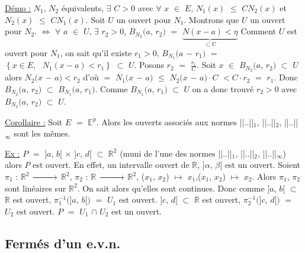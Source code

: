 \documentclass{article}
\begin{document}
\parindent=0cm
\smallbreak
\underline{Démo :} \parindent=1cm \smallbreak
$N_1$, $N_2$ équivalents, $\exists$ $C>0$ avec $\forall$ $x$ $\in$ $E$, $N_1(x)$ $\leqslant$ $CN_2(x)$ et $N_2(x)$ $\leqslant$ $CN_1(x)$.
\smallbreak
Soit $U$ un ouvert pour $N_1$. \smallbreak
Montrons que $U$ un ouvert pour $N_2$. $\Longleftrightarrow$ $\forall$ $a$ $\in$ $U$, $\exists$ $r_2>0$, $B_{N_{2}}(a$, $r_2)$ $=$ $\underset{\subset U}{\underbrace{N(x - a)< \eta}}$
\smallbreak
Comment $U$ est ouvert pour $N_1$, on sait qu'il existe $r_1>0$, $B_{N_{1}}(a$ $-$
$r_1)$ $=$ $\left\{ x \in E,\text{ } N_1(x-a)<r_1 \right\}$ $\subset$ $U$. 
\smallbreak
Posons $r_2$ $=$ $\frac{r_1}{C}$. Soit $x$ $\in$ $B_{N_{2}}(a$, $r_2)$ $\subset$ $U$ alors $N_2(x$ $-$ $a)<r_2$ d'où $=$ $N_1(x$ $-$ $a)$ $\leqslant$ $N_2(x$ $-$ $a) \cdot C$ $<C \cdot r_2$ \smallbreak $=$ $r_1$. Donc $B_{N_{2}}(a$, $r_2)$ $\subset$ $B_{N_{1}}(a$, $r_1)$. Comme $B_{N_{1}}(a$, $r_1)$ $\subset$ $U$ on a donc trouvé $r_2>0$ avec $B_{N_{2}}(a$, $r_2)$ $\subset$ $U$.

\parindent=0cm
\smallbreak
\underline{Corollaire :} \parindent=1cm \smallbreak
Soit $E$ $=$ $\mathbb{E}^p$. Alors les ouverts associés aux normes ||..||$_1$, ||..||$_2$, ||..||$_{\infty}$ sont les mêmes.

\parindent=0cm
\smallbreak
\underline{Ex :} \parindent=1cm \smallbreak $P$ $=$ ]$a$, $b$[ $\times$ ]$c$, $d$[ $\subset$ $\mathbb{R}^2$ (muni de l'une des normes ||..||$_1$, ||..||$_2$, ||..||$_{\infty}$) alors $P$ est ouvert. En effet, \smallbreak un intervalle ouvert de $\mathbb{R}$, ]$\alpha$, $\beta$[ est un ouvert. Soient
\smallbreak$\pi_1$ : $\mathbb{R}^2$ $\xrightarrow{\hspace{0.85cm}}$ $\mathbb{R}^2$, $\pi_2$ : $\mathbb{R}$ $\xrightarrow{\hspace{0.85cm}}$ $\mathbb{R}^2$,
\smallbreak
\hspace{0.65cm}($x_1$, $x_2$) $\mapsto$ $x_1$,\hspace{0.65cm}($x_1$, $x_2$) $\mapsto$ $x_2$. 
\smallbreak
Alors $\pi_1$, $\pi_2$ sont linéaires sur $\mathbb{R}^2$. On sait alors qu'elles sont continues.
\smallbreak
Donc comme ]$a$, $b$[ $\subset$ $\mathbb{R}$ est ouvert, $\pi^{-1}_1($]$a$, $b$[$)$ $=$ $U_1$ est ouvert.
]$c$, $d$[ $\subset$ $\mathbb{R}$ est ouvert, $\pi^{-1}_2($]$c$, $d$[$)$ $=$ $U_2$ \smallbreak est ouvert.
$P$ $=$ $U_1$ $\cap$ $U_2$ est un ouvert.

\subsection{Fermés d'un e.v.n.}
\parindent=0cm
\end{document}
